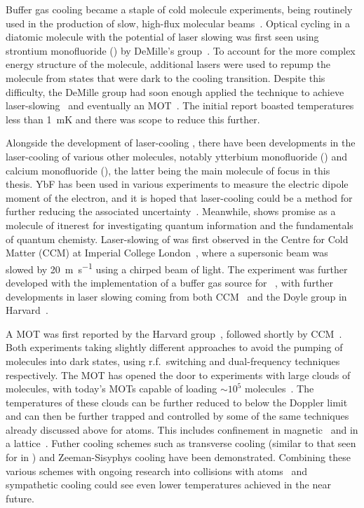Buffer gas cooling became a staple of cold molecule experiments, being
routinely used in the production of slow, high-flux molecular
beams~\cite{Maxwell2005, Patterson2007, Barry2011}.  Optical cycling in a
diatomic molecule with the potential of laser slowing was first seen using
strontium monofluoride (\SrF{}) by DeMille's group~\cite{Shuman2009}. To
account for the more complex energy structure of the molecule, additional
lasers were used to repump the molecule from states that were dark to the
cooling transition.  Despite this difficulty, the DeMille group had soon enough
applied the technique to achieve laser-slowing~\cite{PhysRevLett.108.103002}
and eventually an \SrF{} MOT~\cite{Barry2014, PhysRevLett.116.063004}. The
initial report boasted temperatures less than \SI{1}{\milli\kelvin} and there
was scope to reduce this further.

Alongside the development of laser-cooling \SrF{}, there have been developments
in the laser-cooling of various other molecules, notably ytterbium monofluoride
(\YbF{}) and calcium monofluoride (\CaF{}), the latter being the main molecule
of focus in this thesis. YbF has been used in various experiments to measure
the electric dipole moment of the electron, and it is hoped that laser-cooling
could be a method for further reducing the associated uncertainty~\cite{Fitch2020}. Meanwhile, \CaF{} shows promise as a molecule of
itnerest for investigating quantum information and the fundamentals of quantum
chemisty. Laser-slowing of \CaF{} was first observed in the Centre for
Cold Matter (CCM) at Imperial College London~\cite{PhysRevA.89.053416}, where a
supersonic beam was slowed by \SI{20}{\meter\per\second} using a chirped beam of
light. The \CaF{} experiment was further developed with the implementation of a
buffer gas source for \CaF{}~\cite{Truppe2018}, with further developments in
laser slowing coming from both CCM~\cite{Truppe2017a} and the Doyle group in
Harvard~\cite{0953-4075-49-17-174001}.

A \CaF{} MOT was first reported by the Harvard
group~\cite{PhysRevLett.119.103201}, followed shortly by
CCM~\cite{Williams2017}. Both experiments taking slightly different approaches
to avoid the pumping of molecules into dark states, using r.f.\ switching and
dual-frequency techniques respectively. The \CaF{} MOT has opened the door to
experiments with large clouds of \CaF{} molecules, with today's MOTs capable of
loading $\sim10^5$ molecules~\cite{PhysRevLett.119.103201}. The temperatures of
these clouds can be further reduced to below the Doppler
limit~\cite{Truppe2017, PhysRevLett.123.033202} and can then be further trapped
and controlled by some of the same techniques already discussed above for
atoms. This includes confinement in magnetic~\cite{WilliamsMagnetic2018} and in
a lattice~\cite{Anderegg2019a}. Futher cooling schemes such as transverse
cooling (similar to that seen for \YbF in ) and
Zeeman-Sisyphys cooling have been demonstrated\cite{Fitch2016,
PhysRevLett.127.263002}.  Combining these various schemes with ongoing research
into collisions with atoms~\cite{PhysRevLett.126.153401} and sympathetic
cooling could see even lower \CaF{} temperatures achieved in the near future.

